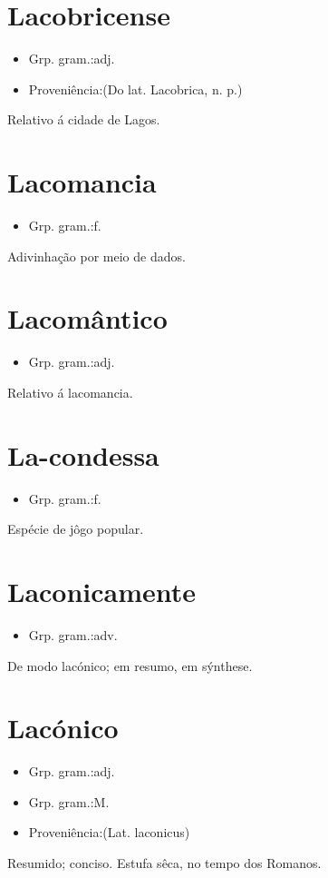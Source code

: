 \section{Lacobricense}
\begin{itemize}
\item {Grp. gram.:adj.}
\end{itemize}
\begin{itemize}
\item {Proveniência:(Do lat. \textunderscore Lacobrica\textunderscore , n. p.)}
\end{itemize}
Relativo á cidade de Lagos.
\section{Lacomancia}
\begin{itemize}
\item {Grp. gram.:f.}
\end{itemize}
Adivinhação por meio de dados.
\section{Lacomântico}
\begin{itemize}
\item {Grp. gram.:adj.}
\end{itemize}
Relativo á lacomancia.
\section{La-condessa}
\begin{itemize}
\item {Grp. gram.:f.}
\end{itemize}
Espécie de jôgo popular.
\section{Laconicamente}
\begin{itemize}
\item {Grp. gram.:adv.}
\end{itemize}
De modo lacónico; em resumo, em sýnthese.
\section{Lacónico}
\begin{itemize}
\item {Grp. gram.:adj.}
\end{itemize}
\begin{itemize}
\item {Grp. gram.:M.}
\end{itemize}
\begin{itemize}
\item {Proveniência:(Lat. \textunderscore laconicus\textunderscore )}
\end{itemize}
Resumido; conciso.
Estufa sêca, no tempo dos Romanos.
